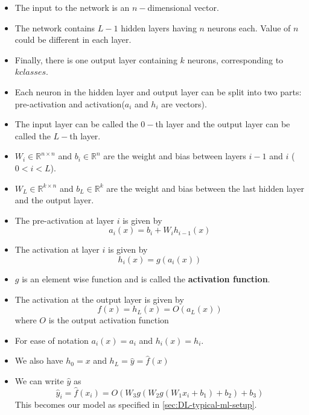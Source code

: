 \documentclass[a4paper]{article}
\begin{document}
\begin{itemize}
    \item The input to the network is an $n-$dimensional vector.
    \item The network contains $L-1$ hidden layers having $n$ neurons each. Value of $n$ could be different in each layer.
    \item Finally, there is one output layer containing $k$ neurons, corresponding to $k classes$.
    \item Each neuron in the hidden layer and output layer can be split into two parts: pre-activation and activation($a_i$ and $h_i$ are vectors).
    \item The input layer can be called the $0-$th layer and the output layer can be called the $L-$th layer.
    \item $W_i\in \mathbb{R}^{n\times n}$ and $b_i\in \mathbb{R}^n$ are the weight and bias between layers $i-1$ and $i$ ($0<i<L$).
    \item $W_L\in \mathbb{R}^{k\times n}$ and $b_L\in \mathbb{R}^k$ are the weight and bias between the last hidden layer and the output layer.
    \item The pre-activation at layer $i$ is given by
    \begin{equation*}
        a_i(x)=b_i+W_ih_{i-1}(x)
    \end{equation*}
    \item The activation at layer $i$ is given by
    \begin{equation*}
        h_i(x)=g(a_i(x))
    \end{equation*}
    \item $g$ is an element wise function and is called the \textbf{activation function}.
    \item The activation at the output layer is given by
    \begin{equation*}
        f(x)=h_L(x)=O(a_L(x))
    \end{equation*}
    where $O$ is the output activation function
    \item For ease of notation $a_i(x)=a_i$ and $h_i(x)=h_i$.
    \item We also have $h_0=x$ and $h_L=\hat{y}=\hat{f}(x)$
    \item We can write $\hat{y}$ as
    \begin{equation*}
        \hat{y}_i=\hat{f}(x_i)=O(W_{3}g(W_{2}g(W_{1}x_i+b_1)+b_2)+b_3)
    \end{equation*}
    This becomes our model as specified in \ref{sec:DL-typical-ml-setup}.

\end{itemize}
\end{document}
